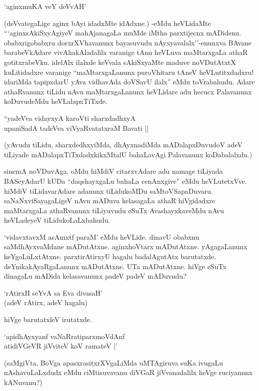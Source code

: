 \begin{shloka}
`aginxmuKA veY deVvAH'
\end{shloka}

(deVvategaLige aginx bAyi idadxMte idAdxne.) -eMdu heVLidaMte ```aginxsAkiSxyAgiyeV mahAjanagaLa muMde iMtha parxtijecnx mADidenu. obabxrigobabxru dorxrXVhavanunx bayasuvudu nAyxyavalalx''-enunxva BAvane barabeVkAdare vivAhakAladalilx varanige tAnu heVLuva maMtarxgaLa athaR gotitxrabeVku. idelAlx ilalxde keVvala sAkiSxyaMte maduve noVDutAtxtX kuLitidadxre varanige ``maMtarxgaLanunx puroVhitaru tAneV heVLutitxdadxru! idariMda tapipxdarU yAva vidhavAda doVSavU ilalx'' eMdu toVrabahudu. Adare athaRvanunx tiLidu nAvu maMtarxgaLanunx heVLidare adu hecucx Palavanunx koDuvudeMdu heVLalapxTiTxde.

\begin{shloka}
``yadeVva vidayxyA karoVti sharxdadhxyA\\
upaniSadA tadeVva viVyaRvatatxraM Bavati ||
\end{shloka}

(yAvudu tiLidu, sharxdedhxyiMda, dhAyxnadiMda mADalapxDuvudoV adeV tiLiyade mADalapxTiTxdadxkikxMtalU bahaLavAgi Palavanunx koDabalalxdu.)

sinemA noVDuvAga, oMdu hiMdiV citarxvAdare adu namage tiLiyada BASeyAdarU kUDa ``daqshayxgaLu bahaLa cenAnxgive'' eMdu heVLutetxVve. hiMdiV tiLidavarAdare adanunx tiLidukoMDu saMtoVSapaDuvaru. saNaNxviSayagaLigeV nAvu mADuva kelasagaLa athaR hiVgidadxre maMtarxgaLa athaRvanunx tiLiyuvudu eSuTx AvashayxkaveMdu nAvu heVLadeyeV tiLidukoLaLxbahudu.

`vidavxtavxM asAmxtf paraM' eMdu heVLide. dinavU obabxnu saMdhAyxvaMdane mADutAtxne. aginxhoVtarx mADutAtxne. yAgagaLanunx keYgoLuLxtAtxne. parxtirAtirxyU hagalu badalAgutAtx barutatxde. deYnikakAyaRgaLanunx mADutAtxne. UTa mADutAtxne. hiVge eSuTx dinagaLu mADida kelasavanunx padeV padeV mADuvudu?

\begin{shloka}
`rAtirxH seYvA sa Eva divasaH'\\
(adeV rAtirx, adeV hagalu)
\end{shloka}

hiVge barutatxleV irutatxde.

\begin{shloka}
`apidhAyxyanf vaNaRratiparxmoVdAnf\\
atidiVGeVR jiVviteV koV ramateV |'
\end{shloka}

(saMgiVta, BoVga apasxrasitxrXVgaLiMda uMTAgiruva suKa ivugaLu nAshavuLaLxdudx eMdu ciMtisuvavanu diVGaR jiVvanadalilx heVge ruciyanunx kANuvanu?)

